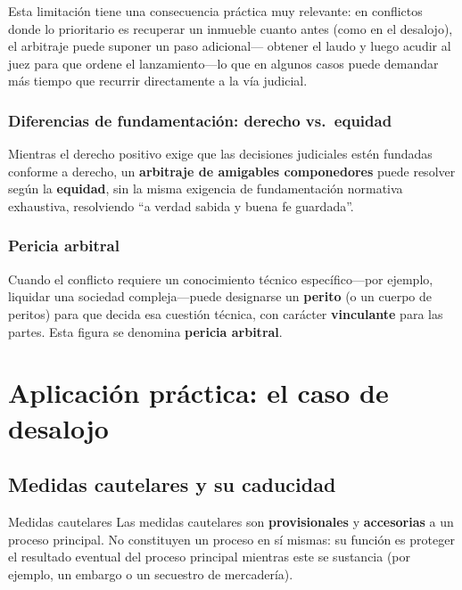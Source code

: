 \documentclass[12pt,oneside]{book}
\begin{document}
Esta limitación tiene una consecuencia práctica muy relevante: en
conflictos donde lo prioritario es recuperar un inmueble cuanto antes
(como en el desalojo), el arbitraje puede suponer un paso adicional---
obtener el laudo y luego acudir al juez para que ordene el
lanzamiento---lo que en algunos casos puede demandar más tiempo que
recurrir directamente a la vía judicial.

\subsection{Diferencias de fundamentaci\'on: derecho vs.\ equidad}

Mientras el derecho positivo exige que las decisiones judiciales estén
fundadas conforme a derecho, un \textbf{arbitraje de amigables
componedores} puede resolver según la \textbf{equidad}, sin la misma
exigencia de fundamentación normativa exhaustiva, resolviendo ``a
verdad sabida y buena fe guardada''.

\subsection{Pericia arbitral}

Cuando el conflicto requiere un conocimiento técnico específico---por
ejemplo, liquidar una sociedad compleja---puede designarse un
\textbf{perito} (o un cuerpo de peritos) para que decida esa cuestión
técnica, con carácter \textbf{vinculante} para las partes. Esta figura
se denomina \textbf{pericia arbitral}.

\chapter{Aplicaci\'on pr\'actica: el caso de desalojo}

\section{Medidas cautelares y su caducidad}

\begin{definition}{Medidas cautelares}
Las medidas cautelares son \textbf{provisionales} y \textbf{accesorias}
a un proceso principal. No constituyen un proceso en sí mismas: su
función es proteger el resultado eventual del proceso principal
mientras este se sustancia (por ejemplo, un embargo o un secuestro de
mercadería).
\end{definition}
\end{document}
